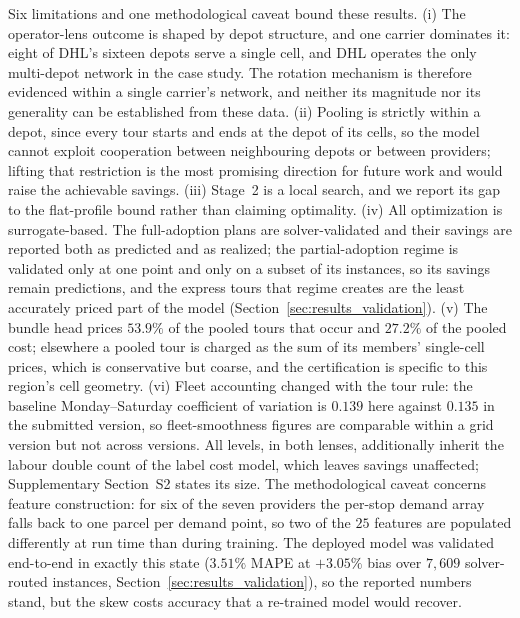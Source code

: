 \documentclass[preprint,12pt,authoryear]{elsarticle}
\begin{document}
Six limitations and one methodological caveat bound these results. (i) The operator-lens outcome is shaped by depot structure, and one carrier dominates it: eight of DHL's sixteen depots serve a single cell, and DHL operates the only multi-depot network in the case study. The rotation mechanism is therefore evidenced within a single carrier's network, and neither its magnitude nor its generality can be established from these data. (ii) Pooling is strictly within a depot, since every tour starts and ends at the depot of its cells, so the model cannot exploit cooperation between neighbouring depots or between providers; lifting that restriction is the most promising direction for future work and would raise the achievable savings. (iii) Stage~2 is a local search, and we report its gap to the flat-profile bound rather than claiming optimality. (iv) All optimization is surrogate-based. The full-adoption plans are solver-validated and their savings are reported both as predicted and as realized; the partial-adoption regime is validated only at one point and only on a subset of its instances, so its savings remain predictions, and the express tours that regime creates are the least accurately priced part of the model (Section~\ref{sec:results_validation}). (v) The bundle head prices $53.9\%$ of the pooled tours that occur and $27.2\%$ of the pooled cost; elsewhere a pooled tour is charged as the sum of its members' single-cell prices, which is conservative but coarse, and the certification is specific to this region's cell geometry. (vi) Fleet accounting changed with the tour rule: the baseline Monday--Saturday coefficient of variation is $0.139$ here against $0.135$ in the submitted version, so fleet-smoothness figures are comparable within a grid version but not across versions. All levels, in both lenses, additionally inherit the labour double count of the label cost model, which leaves savings unaffected; Supplementary Section~S2 states its size. The methodological caveat concerns feature construction: for six of the seven providers the per-stop demand array falls back to one parcel per demand point, so two of the $25$ features are populated differently at run time than during training. The deployed model was validated end-to-end in exactly this state ($3.51\%$ MAPE at $+3.05\%$ bias over $7{,}609$ solver-routed instances, Section~\ref{sec:results_validation}), so the reported numbers stand, but the skew costs accuracy that a re-trained model would recover.
\end{document}
